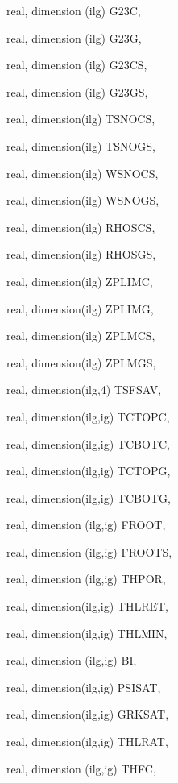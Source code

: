 {\begin{DoxyParamCaption}
\item[{real, dimension  (ilg)}]{G23\+C, }
\item[{real, dimension  (ilg)}]{G23\+G, }
\item[{real, dimension (ilg)}]{G23\+C\+S, }
\item[{real, dimension (ilg)}]{G23\+G\+S, }
\item[{real, dimension(ilg)}]{T\+S\+N\+O\+C\+S, }
\item[{real, dimension(ilg)}]{T\+S\+N\+O\+G\+S, }
\item[{real, dimension(ilg)}]{W\+S\+N\+O\+C\+S, }
\item[{real, dimension(ilg)}]{W\+S\+N\+O\+G\+S, }
\item[{real, dimension(ilg)}]{R\+H\+O\+S\+C\+S, }
\item[{real, dimension(ilg)}]{R\+H\+O\+S\+G\+S, }
\item[{real, dimension(ilg)}]{Z\+P\+L\+I\+M\+C, }
\item[{real, dimension(ilg)}]{Z\+P\+L\+I\+M\+G, }
\item[{real, dimension(ilg)}]{Z\+P\+L\+M\+C\+S, }
\item[{real, dimension(ilg)}]{Z\+P\+L\+M\+G\+S, }
\item[{real, dimension(ilg,4)}]{T\+S\+F\+S\+A\+V, }
\item[{real, dimension(ilg,ig)}]{T\+C\+T\+O\+P\+C, }
\item[{real, dimension(ilg,ig)}]{T\+C\+B\+O\+T\+C, }
\item[{real, dimension(ilg,ig)}]{T\+C\+T\+O\+P\+G, }
\item[{real, dimension(ilg,ig)}]{T\+C\+B\+O\+T\+G, }
\item[{real, dimension (ilg,ig)}]{F\+R\+O\+O\+T, }
\item[{real, dimension (ilg,ig)}]{F\+R\+O\+O\+T\+S, }
\item[{real, dimension (ilg,ig)}]{T\+H\+P\+O\+R, }
\item[{real, dimension(ilg,ig)}]{T\+H\+L\+R\+E\+T, }
\item[{real, dimension(ilg,ig)}]{T\+H\+L\+M\+I\+N, }
\item[{real, dimension    (ilg,ig)}]{B\+I, }
\item[{real, dimension(ilg,ig)}]{P\+S\+I\+S\+A\+T, }
\item[{real, dimension(ilg,ig)}]{G\+R\+K\+S\+A\+T, }
\item[{real, dimension(ilg,ig)}]{T\+H\+L\+R\+A\+T, }
\item[{real, dimension  (ilg,ig)}]{T\+H\+F\+C, }

\end{DoxyParamCaption}}
